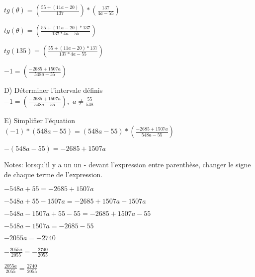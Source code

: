 $
tg(\theta) = (\frac{55+(11a-20)}{137}) * (\frac{137}{4a-55})
$
\vspace{5mm} %

$
tg(\theta) = (\frac{55+(11a-20) *137}{137*4a-55})
$
\vspace{5mm} %

$
tg(135) = (\frac{55+(11a-20) *137}{137*4a-55})
$
\vspace{5mm} %

$
-1 = (\frac{-2685+1507a}{548a-55})
$
\vspace{10mm} %

D) Déterminer l'intervale définis \\

$
-1 = (\frac{-2685+1507a}{548a-55}),
$
$
a\neq \frac{55}{548}
$
\vspace{10mm} %

E) Simplifier l'équation \\

$
(-1)*(548a-55) = (548a-55)*(\frac{-2685+1507a}{548a-55})
$
\vspace{5mm} %

$
-(548a-55) = -2685+1507a
$
\vspace{5mm} %

Notes: lorsqu'il y a un un - devant l'expression entre parenthèse, changer le signe de chaque terme de l'expression.
\vspace{2mm} %

$
-548a+55 = -2685+1507a
$
\vspace{5mm} %

$
-548a+55-1507a = -2685+1507a-1507a
$
\vspace{5mm} %

$
-548a-1507a+55-55 = -2685+1507a-55
$
\vspace{5mm} %

$
-548a-1507a = -2685-55
$
\vspace{5mm} %

$
-2055a = -2740
$
\vspace{5mm} %

$
- \frac{2055a}{2055} = - \frac{2740}{2055}
$
\vspace{5mm} %

$
\frac{2055a}{2055} = \frac{2740}{2055}
$
\vspace{5mm} %

